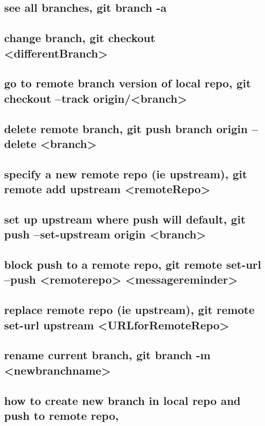\documentclass[11pt]{article}
\begin{document}
\subsection{see all branches, git branch -a}
\label{sec:org3c38faf}
\subsection{change branch, git checkout <differentBranch>}
\label{sec:orgba9be19}
\subsection{go to remote branch version of local repo, git checkout --track origin/<branch>}
\label{sec:org18c7c15}
\subsection{delete remote branch, git push branch origin --delete <branch>}
\label{sec:orgd05f8e1}
\subsection{specify a new remote repo (ie upstream), git remote add upstream <remoteRepo>}
\label{sec:orgc8f87b2}
\subsection{set up upstream where push will default, git push --set-upstream origin <branch>}
\label{sec:org60d078a}
\subsection{block push to a remote repo, git remote set-url --push <remoterepo> <messagereminder>}
\label{sec:orgb87e4e4}
\subsection{replace remote repo (ie upstream), git remote set-url upstream <URLforRemoteRepo>}
\label{sec:org44d31c1}
\subsection{rename current branch, git branch -m <newbranchname>}
\label{sec:org443e430}
\subsection{how to create new branch in local repo and push to remote repo,}
\label{sec:orgd3b8dcd}
\end{document}
